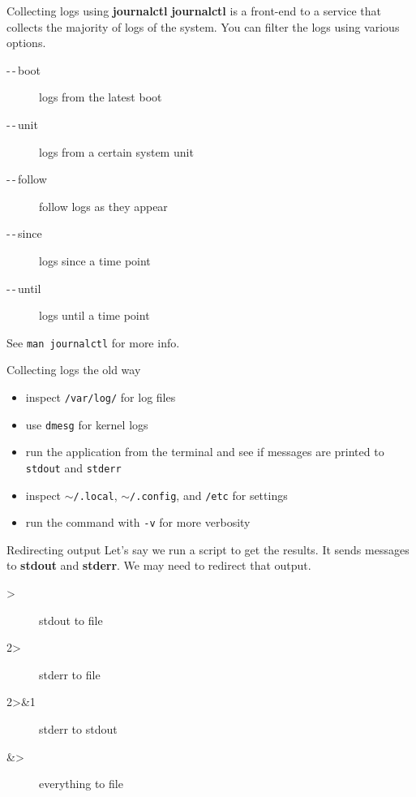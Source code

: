 \documentclass[12pt,aspectratio=169]{beamer}
\begin{document}
\begin{frame}[fragile]{Collecting logs using \textbf{journalctl}}
\textbf{journalctl} is a front-end to a service that collects the majority of logs of the system. You can filter the logs using various options.

\begin{description}
	\item[-\,-\,boot] logs from the latest boot
	\item[-\,-\,unit] logs from a certain system unit
	\item[-\,-\,follow] follow logs as they appear
	\item[-\,-\,since] logs since a time point
	\item[-\,-\,until] logs until a time point
\end{description}

\vspace{5pt}

See {\color{blue}\texttt{man journalctl}} for more info.
\end{frame}

\begin{frame}{Collecting logs the old way}
\begin{itemize}
	\item inspect {\color{blue} \texttt{/var/log/}} for log files 
	\item use {\color{blue} \texttt{dmesg}} for kernel logs 
	\item run the application from the terminal and see if messages are printed to {\color{blue}\texttt{stdout}} and {\color{blue}\texttt{stderr}}
	\item inspect {\color{blue} \texttt{$\sim$/.local}}, {\color{blue} \texttt{$\sim$/.config}}, and {\color{blue} \texttt{/etc}} for settings 
	\item run the command with {\color{blue} \texttt{-v}} for more verbosity
\end{itemize}	
\end{frame}

\begin{frame}{Redirecting output}
Let's say we run a script to get the results. It sends messages to \textbf{stdout} and \textbf{stderr}. We may need to redirect that output.
\begin{description}
	\item[>] stdout to file
	\item[2>] stderr to file
	\item[2>\&1] stderr to stdout
	\item[\&>] everything to file
\end{description}
\end{frame}
\end{document}
